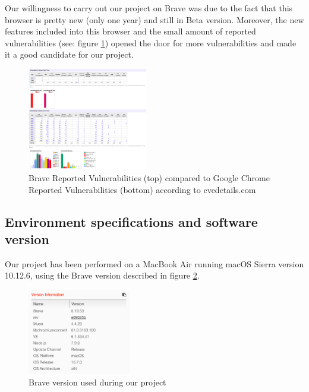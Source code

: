 \documentclass[journal]{IEEEtran}
\begin{document}
\medskip

Our willingness to carry out our project on Brave was due to the fact that this browser is pretty new (only one year) and still in Beta version. Moreover, the new features included into this browser and the small amount of reported vulnerabilities (see: figure \ref{fig:BraveReportedVulnerabilities}) opened the door for more vulnerabilities and made it a good candidate for our project.

\begin{figure}[h]
\centering
\includegraphics[width=0.47\textwidth]{images/BraveReportedVulnerabilities.png}
\caption{Brave Reported Vulnerabilities (top) compared to Google Chrome Reported Vulnerabilities (bottom) according to cvedetails.com}
\label{fig:BraveReportedVulnerabilities}
\end{figure}

\subsection{Environment specifications and software version}

Our project has been performed on a MacBook Air running macOS Sierra version 10.12.6, using the Brave version described in figure \ref{fig:BraveVersion}.

\begin{figure}[h]
\centering
\includegraphics[width=0.4\textwidth]{images/BraveVersion.png}
\caption{Brave version used during our project}
\label{fig:BraveVersion}
\end{figure}
\end{document}
